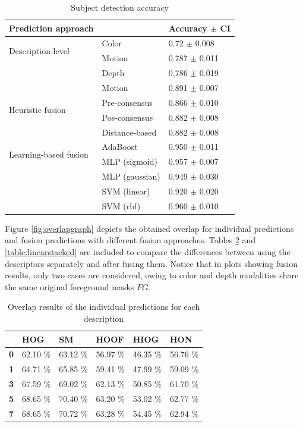 \documentclass[10pt,twocolumn,letterpaper]{article}
\begin{document}
\begin{table}[ht]
\caption{Subject detection accuracy}
\begin{center}
\begin{tabular}{lll}
    \hline
    Prediction approach & & Accuracy $\pm$ CI \\
    \hline
    \multirow{2}{*}{Description-level} & Color & 0.72 $\pm$ 0.008 \\
    & Motion & 0.787 $\pm$ 0.011\\
    & Depth & 0,786 $\pm$ 0.019\\
    & Motion & 0.891 $\pm$ 0.007\\
    \hline
    \multirow{2}{*}{Heuristic fusion} & Pre-consensus & 0.866 $\pm$ 0.010 \\
    & Pos-consensus & 0.882 $\pm$ 0.008\\
    & Distance-based & 0.882 $\pm$ 0.008\\
    \hline
    \multirow{2}{*}{Learning-based fusion} & AdaBoost & 0.950 $\pm$ 0.011 \\
    & MLP (sigmoid) & 0.957 $\pm$ 0.007\\
    & MLP (gaussian) & 0.949 $\pm$ 0.030\\
    & SVM (linear) & 0.920 $\pm$ 0.020\\
    & SVM (rbf) & 0.960 $\pm$ 0.010\\
    \hline
\end{tabular}
\end{center}
\label{tab:subject_detection_accuracy}
\end{table}

Figure \ref{fig:overlapgraph} depicts the obtained overlap for individual predictions and fusion predictions with different fusion approaches. Tables \ref{table:individual} and \ref{table:linearstacked} are included to compare the differences between using the descriptors separately and after fusing them. Notice that in plots showing fusion results, only two cases are considered, owing to color and depth modalities share the same original foreground masks $FG$.

\begin{table}[h]\footnotesize
\center
\caption{Overlap results of the individual predictions for each description}
\label{table:individual}
\begin{tabular}{|l|l|l|l|l|l|}
\hline
&\textbf{HOG}&\textbf{SM}&\textbf{HOOF}&\textbf{HIOG}&\textbf{HON}\\\hline
\textbf{0}&62.10 \% &63.12 \%&56.97 \%&46.35 \%&56.76 \%\\\hline
\textbf{1}&64.71 \%&65.85 \%&59.41 \%&47.99 \%&59.09 \%\\\hline
\textbf{3}&67.59 \%&69.02 \%&62.13 \%&50.85 \%&61.70 \%\\\hline
\textbf{5}&68.65 \%&70.40 \%&63.20 \%&53.02 \%&62.77 \%\\\hline
\textbf{7}&68.65 \%&70.72 \%&63.28 \%&54.45 \%&62.94 \%\\\hline
\end{tabular}
\end{table}
\end{document}
